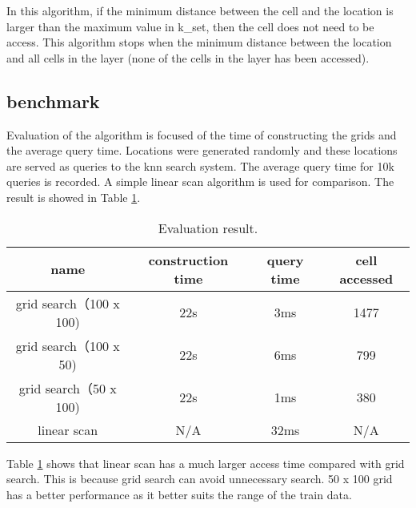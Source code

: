 \documentclass{article}
\def\v#1{{\fontfamily{cmtt}\selectfont #1}}
\begin{document}
In this algorithm, if the minimum distance between the cell and
the location is larger than the maximum value in \v{k\_set},
then the cell does not need to be access. This algorithm stops
when the minimum distance between the location and all cells in the layer
(none of the cells in the layer has been accessed).

\subsection{benchmark}
Evaluation of the algorithm is focused of the time of constructing the grids
and the average query time. Locations were generated randomly and
these locations are served as queries to the knn search system. The average
query time for 10k queries is recorded. A simple linear scan algorithm is
used for comparison. The result is showed in Table \ref{result}.

\begin{table}[tbh]
  \center
  \footnotesize
  \begin{tabular}{c|c|c|c}
    \textbf{name} & \textbf{construction time} & \textbf{query time} & \textbf{cell accessed}\\
    \hline
    grid search（100 x 100) & 22s & 3ms & 1477 \\
    \hline
    grid search（100 x 50) & 22s & 6ms & 799 \\
    \hline
    grid search（50 x 100) & 22s & 1ms & 380 \\
    \hline
    linear scan & N/A & 32ms & N/A
  \end{tabular}
  \caption{Evaluation result.}
  \label{result}
\end{table}

Table \ref{result} shows that linear scan has a much larger access time compared with
grid search. This is because grid search can avoid unnecessary search. 50 x 100 grid
has a better performance as it better suits the range of the train data.
\end{document}
